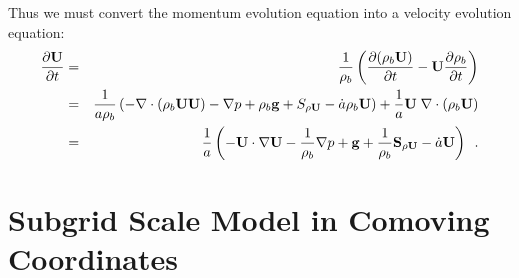 \noindent Thus we must convert the momentum evolution equation into a velocity evolution equation:
\begin{eqnarray}
\frac{\partial{\bf U}}{\partial t} &=&  \frac{1}{\rho_b} \left(
\frac{\partial (\rho_b {\bf U})}{\partial t}  - {\bf U} \frac{\partial \rho_b}{\partial t}  \right) \\
&=&  \frac{1}{a \rho_b} \left(
- \nabla \cdot (\rho_b {\bf U} {\bf U})
- \nabla p
+ \rho_b {\bf g}
+ S_{\rho {\bf U}}
- \dot{a} \rho_b {\bf U} \right) 
+ \frac{1}{a}  {\bf U} \; \nabla \cdot (\rho_b {\bf U}) \\
&=&  \frac{1}{a} \left(
- {\bf U} \cdot \nabla {\bf U}
- \frac{1}{\rho_b} \nabla p
+ {\bf g}
+ \frac{1}{\rho_b} {\bf S}_{\rho {\bf U}}
- \dot{a} {\bf U} \right) \enskip .
\end{eqnarray}

\section{Subgrid Scale Model in Comoving Coordinates}

